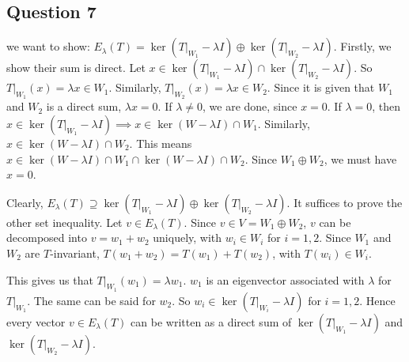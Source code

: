 \documentclass{article}
\begin{document}
\subsection*{Question 7}
we want to show: $E_{\lambda}(T) = \ker (T|_{W_1}- \lambda I) \oplus \ker(T|_{W_2} -\lambda I)$. Firstly, we show their sum is direct. Let $x \in \ker (T|_{W_1}- \lambda I) \cap \ker(T|_{W_2} -\lambda I)$. So $T|_{W_1}(x) = \lambda x \in W_1$. Similarly, $T|_{W_2}(x) = \lambda x \in W_2$. Since it is given that $W_1$ and $W_2$ is a direct sum, $\lambda x =0$. If $\lambda \neq 0$, we are done, since $x=0$. If $\lambda =0$, then $x \in \ker (T|_{W_1}- \lambda I) \implies x \in \ker (W - \lambda I) \cap W_1$. Similarly, $x \in \ker (W - \lambda I) \cap W_2$. This means $x \in \ker (W - \lambda I) \cap W_1 \cap \ker (W - \lambda I) \cap W_2$. Since $W_1 \oplus W_2$, we must have $x=0$.

Clearly, $E_{\lambda}(T) \supseteq \ker (T|_{W_1}- \lambda I) \oplus \ker(T|_{W_2} -\lambda I)$. It suffices to prove the other set inequality. Let $v \in E_{\lambda}(T)$. Since $v \in V = W_1 \oplus W_2$, $v$ can be decomposed into $v=w_1+w_2$ uniquely, with $w_i \in W_i$ for $i=1,2$. Since $W_1$ and $W_2$ are $T$-invariant, $T(w_1+w_2)=T(w_1)+T(w_2)$, with $T(w_i) \in W_i$. 


This gives us that $T|_{W_1}(w_1)=\lambda w_1$. $w_1$ is an eigenvector associated with $\lambda$ for $T|_{W_1}$. The same can be said for $w_2$. So $w_i \in \ker(T|_{W_i}-\lambda I)$ for $i=1,2$. Hence every vector $v \in E_{\lambda}(T)$ can be written as a direct sum of $\ker(T|_{W_1}-\lambda I)$ and $\ker(T|_{W_2}-\lambda I)$.
\end{document}
